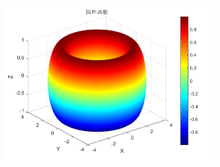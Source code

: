\documentclass[UTF8]{ctexart}
\begin{document}
	\centerline{\includegraphics[width=0.7\textwidth]{figure_for_ans_2}}
	
	
\end{document}
